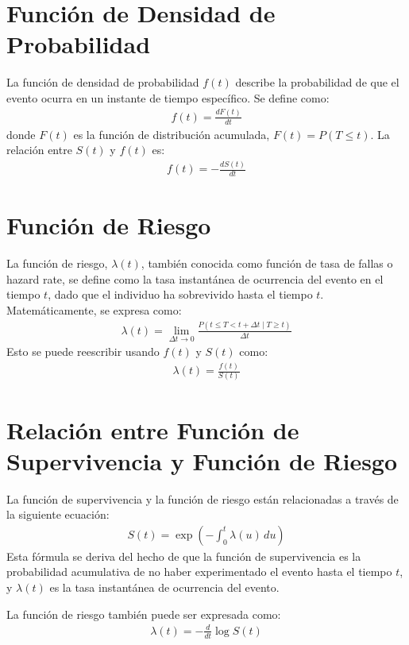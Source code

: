 \documentclass[a4paper]{report} %
\begin{document}
\section{Funci\'on de Densidad de Probabilidad}
La funci\'on de densidad de probabilidad $f(t)$ describe la probabilidad de que el evento ocurra en un instante de tiempo espec\'ifico. Se define como:
\begin{eqnarray*}
f(t) = \frac{dF(t)}{dt}
\end{eqnarray*}
donde $F(t)$ es la funci\'on de distribuci\'on acumulada, $F(t) = P(T \leq t)$. La relaci\'on entre $S(t)$ y $f(t)$ es:
\begin{eqnarray*}
f(t) = -\frac{dS(t)}{dt}
\end{eqnarray*}

\section{Funci\'on de Riesgo}
La funci\'on de riesgo, $\lambda(t)$, tambi\'en conocida como funci\'on de tasa de fallas o hazard rate, se define como la tasa instant\'anea de ocurrencia del evento en el tiempo $t$, dado que el individuo ha sobrevivido hasta el tiempo $t$. Matem\'aticamente, se expresa como:
\begin{eqnarray*}
\lambda(t) = \lim_{\Delta t \to 0} \frac{P(t \leq T < t + \Delta t \mid T \geq t)}{\Delta t}
\end{eqnarray*}
Esto se puede reescribir usando $f(t)$ y $S(t)$ como:
\begin{eqnarray*}
\lambda(t) = \frac{f(t)}{S(t)}
\end{eqnarray*}

\section{Relaci\'on entre Funci\'on de Supervivencia y Funci\'on de Riesgo}
La funci\'on de supervivencia y la funci\'on de riesgo est\'an relacionadas a trav\'es de la siguiente ecuaci\'on:
\begin{eqnarray*}
S(t) = \exp\left(-\int_0^t \lambda(u) \, du\right)
\end{eqnarray*}
Esta f\'ormula se deriva del hecho de que la funci\'on de supervivencia es la probabilidad acumulativa de no haber experimentado el evento hasta el tiempo $t$, y $\lambda(t)$ es la tasa instant\'anea de ocurrencia del evento.

La funci\'on de riesgo tambi\'en puede ser expresada como:
\begin{eqnarray*}
\lambda(t) = -\frac{d}{dt} \log S(t)
\end{eqnarray*}
\end{document}
